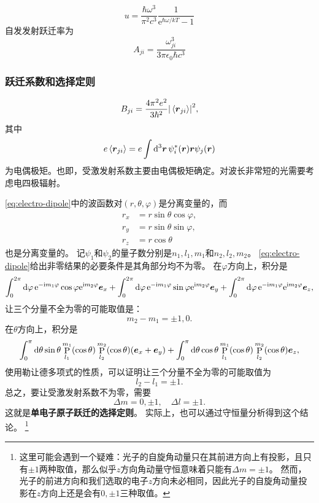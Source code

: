 \documentclass[UTF8, a4paper]{ctexart}
\newcommand*{\ee}{\mathrm{e}}
\newcommand*{\ii}{\mathrm{i}}
\DeclareMathOperator{\legpoly}{P}
\begin{document}
\[
    u = \frac{\hbar \omega^3}{\pi^2 c^3} \frac{1}{\ee^{\hbar \omega / kT} - 1}
\]
自发发射跃迁率为
\[
    A_{ji} = \frac{\omega_{ji}^3}{3\pi \epsilon_0 \hbar c^3}
\]

\subsubsection{跃迁系数和选择定则}

\begin{equation}
    B_{ji} = \frac{4\pi^2 e^2}{3 \hbar^2} \abs{\expval*{\vb*{r}_{ji}}}^2,
\end{equation}
其中
\begin{equation}
    e \expval*{\vb*{r}_{ji}} = e \int \dd[3]{\vb*{r}} \psi_i^*(\vb*{r}) \vb*{r} \psi_j(\vb*{r})
    \label{eq:electro-dipole}
\end{equation}
为电偶极矩。也即，受激发射系数主要由电偶极矩确定。对波长非常短的光需要考虑电四极辐射。

\eqref{eq:electro-dipole}中的波函数对$(r, \theta, \varphi)$是分离变量的，而
\[
    \begin{aligned}
        r_x &= r \sin \theta \cos \varphi, \\
        r_y &= r \sin \theta \sin \varphi, \\
        r_z &= r \cos \theta 
    \end{aligned}
\]
也是分离变量的。
记$\psi_1$和$\psi_2$的量子数分别是$n_1, l_1, m_1$和$n_2, l_2, m_2$。
\eqref{eq:electro-dipole}给出非零结果的必要条件是其角部分均不为零。
在$\varphi$方向上，积分是
\[
    \int_0^{2\pi} \dd{\varphi} \ee^{ - \ii m_1 \varphi} \cos \varphi \ee^{\ii m_2 \varphi} \vb*{e}_x + \int_0^{2\pi} \dd{\varphi} \ee^{ - \ii m_1 \varphi} \sin \varphi \ee^{\ii m_2 \varphi} \vb*{e}_y + \int_0^{2\pi} \dd{\varphi} \ee^{ - \ii m_1 \varphi} \ee^{\ii m_2 \varphi} \vb*{e}_z,
\]
让三个分量不全为零的可能取值是：
\[
    m_2 - m_1 = \pm 1, 0.
\]
在$\theta$方向上，积分是
\[
    \int_0^\pi \dd{\theta} \sin \theta \legpoly_{l_1}^{m_1} (\cos \theta) \legpoly_{l_2}^{m_2} (\cos \theta) (\vb*{e}_x + \vb*{e}_y) + \int_0^\pi \dd{\theta} \cos \theta \legpoly_{l_1}^{m_1} (\cos \theta) \legpoly_{l_2}^{m_2} (\cos \theta) \vb*{e}_z,
\]
使用勒让德多项式的性质，可以证明让三个分量不全为零的可能取值为
\[
    l_2 - l_1 = \pm 1.
\]
总之，要让受激发射系数不为零，需要
\begin{equation}
    \Delta m = 0, \pm 1, \quad \Delta l = \pm 1.
\end{equation}
这就是\textbf{单电子原子跃迁的选择定则}。
实际上，也可以通过守恒量分析得到这个结论。%
\footnote{这里可能会遇到一个疑难：光子的自旋角动量只在其前进方向上有投影，且只有$\pm 1$两种取值，那么似乎$z$方向角动量守恒意味着只能有$\Delta m = \pm 1$。
然而，光子的前进方向和我们选取的电子$z$方向未必相同，因此光子的自旋角动量投影在$z$方向上还是会有$0, \pm 1$三种取值。
}%
\end{document}
